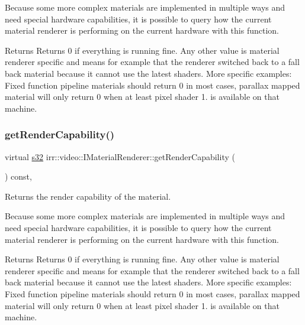 Because some more complex materials are implemented in multiple ways and need special hardware capabilities, it is possible to query how the current material renderer is performing on the current hardware with this function. \begin{DoxyReturn}{Returns}
Returns 0 if everything is running fine. Any other value is material renderer specific and means for example that the renderer switched back to a fall back material because it cannot use the latest shaders. More specific examples\+: Fixed function pipeline materials should return 0 in most cases, parallax mapped material will only return 0 when at least pixel shader 1. is available on that machine. 
\end{DoxyReturn}
\mbox{\label{classirr_1_1video_1_1IMaterialRenderer_a5ca13576cb3f466cf2cd9427926121fa}} 
\subsubsection{\texorpdfstring{get\+Render\+Capability()}{getRenderCapability()}\hspace{0.1cm}{\footnotesize\ttfamily [2/2]}}
{\footnotesize\ttfamily virtual \hyperlink{namespaceirr_ac66849b7a6ed16e30ebede579f9b47c6}{s32} irr\+::video\+::\+I\+Material\+Renderer\+::get\+Render\+Capability (\begin{DoxyParamCaption}{ }\end{DoxyParamCaption}) const\hspace{0.3cm}{\ttfamily [inline]}, {\ttfamily [virtual]}}



Returns the render capability of the material. 

Because some more complex materials are implemented in multiple ways and need special hardware capabilities, it is possible to query how the current material renderer is performing on the current hardware with this function. \begin{DoxyReturn}{Returns}
Returns 0 if everything is running fine. Any other value is material renderer specific and means for example that the renderer switched back to a fall back material because it cannot use the latest shaders. More specific examples\+: Fixed function pipeline materials should return 0 in most cases, parallax mapped material will only return 0 when at least pixel shader 1. is available on that machine. 
\end{DoxyReturn}
\mbox{\label{classirr_1_1video_1_1IMaterialRenderer_ac472a5832eed8d848240c82278e56312}} 
